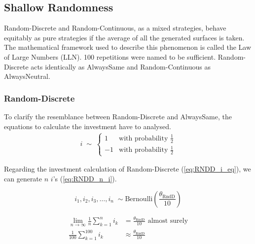 \documentclass[11pt]{article}
\begin{document}
\subsection{Shallow Randomness} \label{sec:shallow_randomness}

	Random-Discrete and Random-Continuous, as a mixed strategies, behave equitably as pure strategies if the average of all the generated surfaces is taken.
	The mathematical framework used to describe this phenomenon is called the Law of Large Numbers (LLN).
	100 repetitions were named to be sufficient.
	Random-Discrete acts identically as AlwaysSame and Random-Continuous as AlwaysNeutral.

\subsubsection*{Random-Discrete}
		
	To clarify the resemblance between Random-Discrete and AlwaysSame, the equations to calculate the investment have to analysed.
	\begin{equation}
		\begin{split}
		i \;\sim\;
		\begin{cases}
		  1 & \text{with probability } \frac{1}{2}\\
		 -1 & \text{with probability } \frac{1}{2} 
		\end{cases}
		\label{eq:RNDD_i_eq}
		\end{split}
	\end{equation}

	Regarding the investment calculation of Random-Discrete (\ref{eq:RNDD_i_eq}), we can generate $n$ $i$'s (\ref{eq:RNDD_n_i}).

	\begin{equation}
		i_1, i_2, i_3, \dots, i_n \;\sim \mathrm{Bernoulli}(\frac{\theta_{\mathrm{RndD}}}{10})
		\label{eq:RNDD_n_i}
	\end{equation}

	\begin{equation}
		\begin{split}
			\lim_{n\to\infty} \frac{1}{n} \sum_{k=1}^{n} i_k &= \frac{\theta_{\mathrm{RndD}}}{10} \text{ almost surely}\\
			\frac{1}{100} \sum_{k=1}^{100} i_k &\approx \frac{\theta_{\mathrm{RndD}}}{10}
		\label{eq:RNDD_approx_eq}
		\end{split}
	\end{equation}
\end{document}
